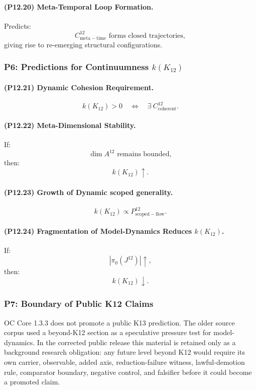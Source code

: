 \paragraph{(P12.20) Meta-Temporal Loop Formation.}
Predicts:
\[
C_{\mathrm{meta-time}}^{12}
\text{ forms closed trajectories},
\]
giving rise to re-emerging structural configurations.

\subsubsection{P6: Predictions for Continuumness $k(K_{12})$}

\paragraph{(P12.21) Dynamic Cohesion Requirement.}
\[
k(K_{12}) > 0 
\quad\Leftrightarrow\quad 
\exists\ C^{12}_{\mathrm{coherent}}.
\]

\paragraph{(P12.22) Meta-Dimensional Stability.}
If:
\[
\dim A^{12} \text{ remains bounded},
\]
then:
\[
k(K_{12}) \uparrow.
\]

\paragraph{(P12.23) Growth of Dynamic scoped generality.}
\[
k(K_{12}) \propto P_{\mathrm{scoped-flow}}^{12}.
\]

\paragraph{(P12.24) Fragmentation of Model-Dynamics Reduces $k(K_{12})$.}
If:
\[
|\pi_0(J^{12})| \uparrow,
\]
then:
\[
k(K_{12}) \downarrow.
\]

\subsubsection{P7: Boundary of Public K12 Claims}

OC Core 1.3.3 does not promote a public K13 prediction. The older source corpus used a beyond-K12 section as a speculative pressure test for model-dynamics. In the corrected public release this material is retained only as a background research obligation: any future level beyond K12 would require its own carrier, observable, added axis, reduction-failure witness, lawful-demotion rule, comparator boundary, negative control, and falsifier before it could become a promoted claim.

